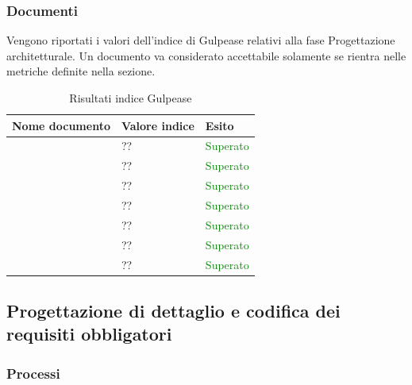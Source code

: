 	 	\subsubsection{Documenti}	 	
	 	Vengono riportati i valori dell'indice di Gulpease relativi alla fase Progettazione architetturale. Un documento va considerato accettabile solamente se rientra nelle metriche definite nella sezione.
		\begin{table}[!ht]
			\begin{center}
				\begin{tabularx}{0.9\textwidth}{|l|l|X|}
					\hline
					\textbf{Nome documento} & \textbf{Valore indice} & \textbf{Esito}\\
					\hline						
					\docNameVersionAdR & ?? & \textcolor{green}{Superato}\\
					\hline
					\docNameVersionGlo & ?? & \textcolor{green}{Superato}\\
					\hline					
					\docNameVersionNdP & ?? & \textcolor{green}{Superato}\\
					\hline					
					\docNameVersionPdP & ?? & \textcolor{green}{Superato}\\
					\hline					
					\docNameVersionPdQ & ?? & \textcolor{green}{Superato}\\
					\hline					
					\docNameVersionSdF & ?? & \textcolor{green}{Superato}\\
					\hline	
					\docNameVersionST & ?? & \textcolor{green}{Superato}\\
					\hline			
				\end{tabularx}
			\end{center}
			\caption{Risultati indice Gulpease}
		\end{table}
		\subsection{Progettazione di dettaglio e codifica dei requisiti obbligatori}
		\subsubsection{Processi}
		
